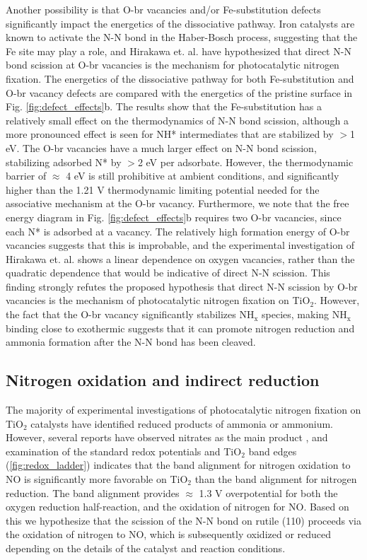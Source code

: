 \documentclass[journal=ascecg,manuscript=article,articletitle=true]{achemso}
\begin{document}
Another possibility is that O-br vacancies and/or Fe-substitution defects significantly impact the energetics of the dissociative pathway. Iron catalysts are known to activate the N-N bond in the Haber-Bosch process\cite{Emmett_1933, Honkala_2005}, suggesting that the Fe site may play a role, and Hirakawa et. al. \cite{Hirakawa_2017} have hypothesized that direct N-N bond scission at O-br vacancies is the mechanism for photocatalytic nitrogen fixation. The energetics of the dissociative pathway for both Fe-substitution and O-br vacancy defects are compared with the energetics of the pristine surface in Fig. \ref{fig:defect_effects}b. The results show that the Fe-substitution has a relatively small effect on the thermodynamics of N-N bond scission, although a more pronounced effect is seen for NH* intermediates that are stabilized by $>$1 eV. The O-br vacancies have a much larger effect on N-N bond scission, stabilizing adsorbed N* by $>$2 eV per adsorbate. However, the thermodynamic barrier of $\approx$ 4 eV is still prohibitive at ambient conditions, and significantly higher than the 1.21 V thermodynamic limiting potential needed for the associative mechanism at the O-br vacancy. Furthermore, we note that the free energy diagram in Fig. \ref{fig:defect_effects}b requires two O-br vacancies, since each N* is adsorbed at a vacancy. The relatively high formation energy of O-br vacancies suggests that this is improbable, and the experimental investigation of Hirakawa et. al. \cite{Hirakawa_2017} shows a linear dependence on oxygen vacancies, rather than the quadratic dependence that would be indicative of direct N-N scission. This finding strongly refutes the proposed hypothesis that direct N-N scission by O-br vacancies is the mechanism of photocatalytic nitrogen fixation on TiO$_2$. However, the fact that the O-br vacancy significantly stabilizes NH$_{\mathrm{x}}$ species, making NH$_{\mathrm{x}}$ binding close to exothermic suggests that it can promote nitrogen reduction and ammonia formation after the N-N bond has been cleaved.

\subsection{Nitrogen oxidation and indirect reduction}

The majority of experimental investigations of photocatalytic nitrogen fixation on TiO$_2$ catalysts have identified reduced products of ammonia or ammonium. However, several reports have observed nitrates as the main product \cite{Bickley_1979, Yuan_2013}, and examination of the standard redox potentials and TiO$_2$ band edges (\ref{fig:redox_ladder}) indicates that the band alignment for nitrogen oxidation to NO is significantly more favorable on TiO$_2$ than the band alignment for nitrogen reduction. The band alignment provides $\approx$ 1.3 V overpotential for both the oxygen reduction half-reaction, and the oxidation of nitrogen for NO. Based on this we hypothesize that the scission of the N-N bond on rutile (110) proceeds via the oxidation of nitrogen to NO, which is subsequently oxidized or reduced depending on the details of the catalyst and reaction conditions.
\end{document}
